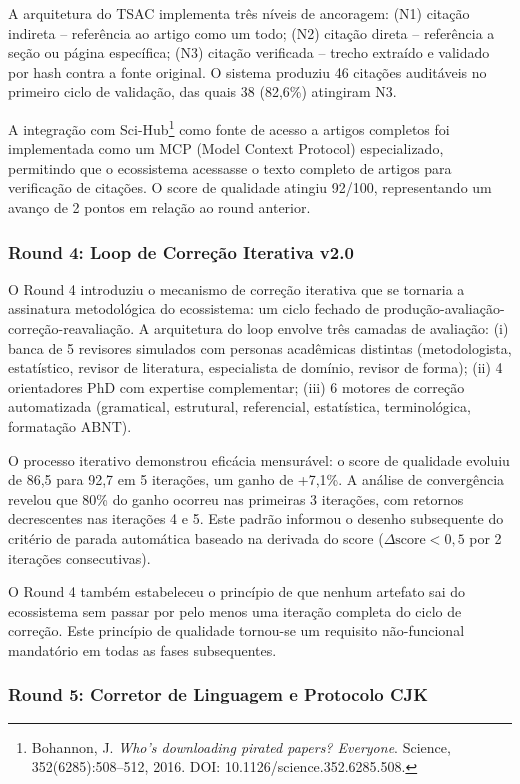 A arquitetura do TSAC implementa três níveis de ancoragem: (N1) citação
indireta -- referência ao artigo como um todo; (N2) citação direta --
referência a seção ou página específica; (N3) citação verificada --
trecho extraído e validado por hash contra a fonte original. O sistema
produziu 46 citações auditáveis no primeiro ciclo de validação, das
quais 38 (82,6\%) atingiram N3.

A integração com Sci-Hub\footnote{Bohannon, J. \textit{Who's downloading
pirated papers? Everyone}. Science, 352(6285):508--512, 2016. DOI:
10.1126/science.352.6285.508.} como fonte de acesso a artigos
completos foi implementada como um MCP (Model Context Protocol)
especializado, permitindo que o ecossistema acessasse o texto completo de
artigos para verificação de citações. O score de qualidade atingiu 92/100,
representando um avanço de 2 pontos em relação ao round anterior.

\subsubsection{Round 4: Loop de Correção Iterativa v2.0}

O Round 4 introduziu o mecanismo de correção iterativa que se tornaria a
assinatura metodológica do ecossistema: um ciclo fechado de
produção-avaliação-correção-reavaliação. A arquitetura do loop envolve
três camadas de avaliação: (i) banca de 5 revisores simulados com
personas acadêmicas distintas (metodologista, estatístico, revisor de
literatura, especialista de domínio, revisor de forma); (ii) 4
orientadores PhD com expertise complementar; (iii) 6 motores de correção
automatizada (gramatical, estrutural, referencial, estatística,
terminológica, formatação ABNT).

O processo iterativo demonstrou eficácia mensurável: o score de qualidade
evoluiu de 86,5 para 92,7 em 5 iterações, um ganho de +7,1\%. A análise
de convergência revelou que 80\% do ganho ocorreu nas primeiras 3
iterações, com retornos decrescentes nas iterações 4 e 5. Este padrão
informou o desenho subsequente do critério de parada automática baseado
na derivada do score ($\Delta\text{score} < 0{,}5$ por 2 iterações
consecutivas).

O Round 4 também estabeleceu o princípio de que nenhum artefato sai do
ecossistema sem passar por pelo menos uma iteração completa do ciclo de
correção. Este princípio de qualidade tornou-se um requisito não-funcional
mandatório em todas as fases subsequentes.

\subsubsection{Round 5: Corretor de Linguagem e Protocolo CJK}

